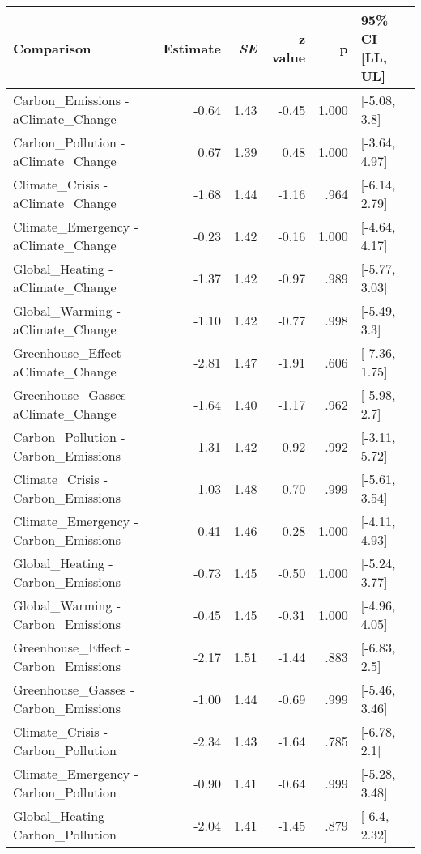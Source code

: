 \begin{table}[ht]
\centering
\begin{tabular}{lrrrrl}
  \hline
Comparison & Estimate & \textit{SE} & z value & p & 95\% CI [LL, UL] \\ 
  \hline
Carbon\_Emissions - aClimate\_Change & -0.64 & 1.43 & -0.45 & 1.000 & [-5.08, 3.8] \\ 
  Carbon\_Pollution - aClimate\_Change & 0.67 & 1.39 & 0.48 & 1.000 & [-3.64, 4.97] \\ 
  Climate\_Crisis - aClimate\_Change & -1.68 & 1.44 & -1.16 & .964 & [-6.14, 2.79] \\ 
  Climate\_Emergency - aClimate\_Change & -0.23 & 1.42 & -0.16 & 1.000 & [-4.64, 4.17] \\ 
  Global\_Heating - aClimate\_Change & -1.37 & 1.42 & -0.97 & .989 & [-5.77, 3.03] \\ 
  Global\_Warming - aClimate\_Change & -1.10 & 1.42 & -0.77 & .998 & [-5.49, 3.3] \\ 
  Greenhouse\_Effect - aClimate\_Change & -2.81 & 1.47 & -1.91 & .606 & [-7.36, 1.75] \\ 
  Greenhouse\_Gasses - aClimate\_Change & -1.64 & 1.40 & -1.17 & .962 & [-5.98, 2.7] \\ 
  Carbon\_Pollution - Carbon\_Emissions & 1.31 & 1.42 & 0.92 & .992 & [-3.11, 5.72] \\ 
  Climate\_Crisis - Carbon\_Emissions & -1.03 & 1.48 & -0.70 & .999 & [-5.61, 3.54] \\ 
  Climate\_Emergency - Carbon\_Emissions & 0.41 & 1.46 & 0.28 & 1.000 & [-4.11, 4.93] \\ 
  Global\_Heating - Carbon\_Emissions & -0.73 & 1.45 & -0.50 & 1.000 & [-5.24, 3.77] \\ 
  Global\_Warming - Carbon\_Emissions & -0.45 & 1.45 & -0.31 & 1.000 & [-4.96, 4.05] \\ 
  Greenhouse\_Effect - Carbon\_Emissions & -2.17 & 1.51 & -1.44 & .883 & [-6.83, 2.5] \\ 
  Greenhouse\_Gasses - Carbon\_Emissions & -1.00 & 1.44 & -0.69 & .999 & [-5.46, 3.46] \\ 
  Climate\_Crisis - Carbon\_Pollution & -2.34 & 1.43 & -1.64 & .785 & [-6.78, 2.1] \\ 
  Climate\_Emergency - Carbon\_Pollution & -0.90 & 1.41 & -0.64 & .999 & [-5.28, 3.48] \\ 
  Global\_Heating - Carbon\_Pollution & -2.04 & 1.41 & -1.45 & .879 & [-6.4, 2.32] \\ 

\end{tabular}
\end{table}
